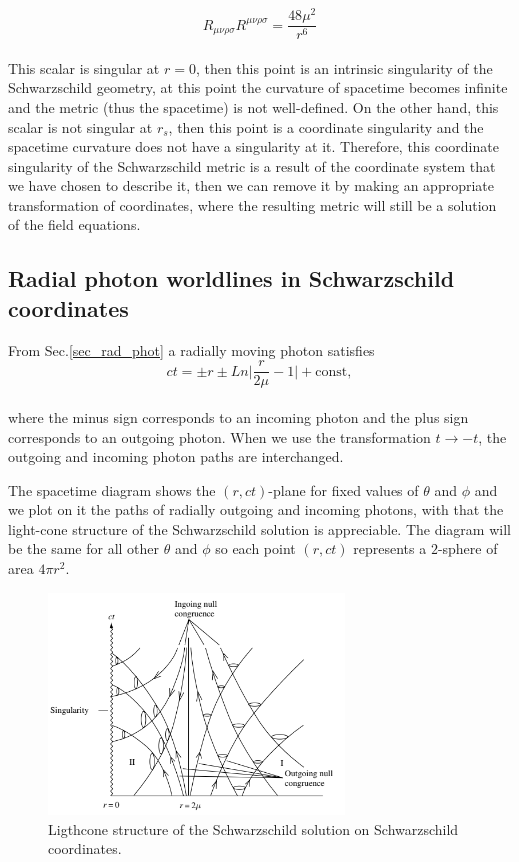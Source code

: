 \documentclass[letterpaper,11pt,onecolumn]{article}
\begin{document}
\begin{equation*}
    R_{\mu\nu\rho\sigma}R^{\mu\nu\rho\sigma}=\frac{48\mu^2}{r^6}
\end{equation*}
\\
This scalar is singular at $r=0$, then this point is an intrinsic singularity of the Schwarzschild geometry, at this point the curvature of spacetime becomes infinite and the metric (thus the spacetime) is not well-defined. On the other hand, this scalar is not singular at $r_s$, then this point is a coordinate singularity and the spacetime curvature does not have a singularity at it. Therefore, this coordinate singularity of the Schwarzschild metric is a result of the coordinate system that we have chosen to describe it, then we can remove it by making an appropriate transformation of coordinates, where the resulting metric will still be a solution of the field equations.

\subsection{Radial photon worldlines in Schwarzschild coordinates}

From Sec.\ref{sec_rad_phot} a radially moving photon satisfies
\\

\begin{equation}
ct=\pm r\pm Ln\Big| \frac{r}{2\mu}-1 \Big| + \text{const}, \label{3}
\end{equation}
\\
where the minus sign corresponds to an incoming photon and the plus sign corresponds to an outgoing photon. When we use the transformation $t\rightarrow -t$, the outgoing and incoming photon paths are interchanged.

The spacetime diagram shows the $(r,ct)$-plane for fixed values of $\theta$ and $\phi$ and we plot on it the paths of radially outgoing and incoming photons, with that the light-cone structure of the Schwarzschild solution is appreciable. The diagram will be the same for all other $\theta$ and $\phi$ so each point $(r,ct)$ represents a $2$-sphere of area $4\pi r^2$.\\

\begin{figure}[h!]
    \centering
    \includegraphics[width=0.7\textwidth]{Report/Images/4bhphotons.png}
    \caption{Ligthcone structure of the Schwarzschild solution on Schwarzschild coordinates.}
\label{fig11}
\end{figure}
\end{document}
